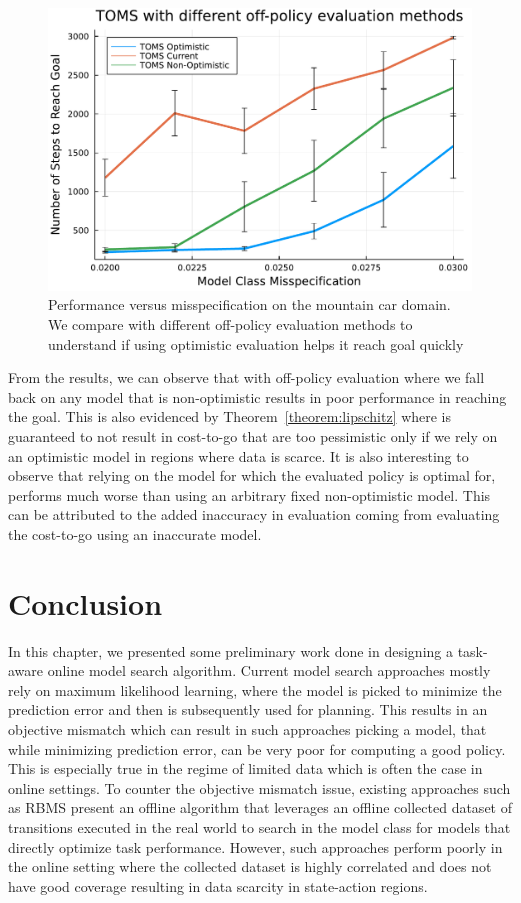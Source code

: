\begin{figure}[t]
  \centering
  \includegraphics[width=0.5\linewidth]{figures/taml/mountain_car_online_model_search_toms.pdf}
  \caption{Performance versus misspecification on the mountain car
    domain. We compare \taml{} with different off-policy evaluation
    methods to understand if using optimistic evaluation helps it
    reach goal quickly}
  \label{fig:evaluation}
\end{figure}

From the results, we can observe that \taml{} with off-policy
evaluation where we fall back on any model that is non-optimistic
results in poor performance in reaching the goal. This is also
evidenced by Theorem~\ref{theorem:lipschitz} where \taml{} is
guaranteed to not result in cost-to-go that are too pessimistic only
if we rely on an optimistic model in regions where data is scarce. It
is also interesting to observe that relying on the model for which the
evaluated policy is optimal for, performs much worse than using an
arbitrary fixed non-optimistic model. This can be attributed to the
added inaccuracy in evaluation coming from evaluating the cost-to-go
using an inaccurate model. 

\section{Conclusion}
\label{sec:discussion-1}

In this chapter, we presented some preliminary work done in designing
a task-aware online model search algorithm. Current model search
approaches mostly rely on maximum likelihood learning, where the model
is picked to minimize the prediction error and then is subsequently
used for planning. This results in an objective mismatch which can
result in such approaches picking a model, that while minimizing
prediction error, can be very poor for computing a good policy. This
is especially true in the regime of limited data which is often the
case in online settings. To counter the objective mismatch issue,
existing approaches such as RBMS present an offline algorithm that
leverages an offline collected dataset of transitions executed in the
real world to search in the model class for models that directly
optimize task performance. However, such approaches perform poorly in
the online setting where the collected dataset is highly correlated
and does not have good coverage resulting in data scarcity in
state-action regions.

